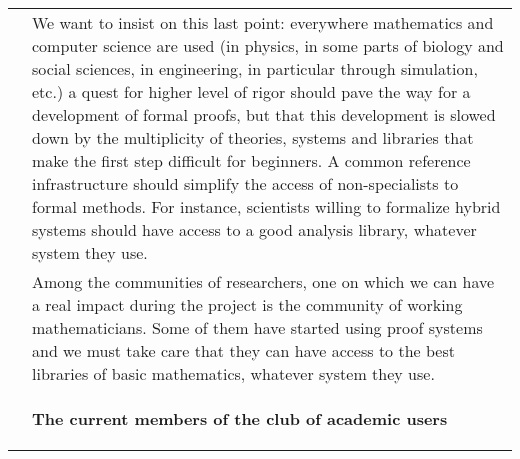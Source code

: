 \begin{longtable}{|p{}|p{}|}
&
\hspace{0.4cm}
We want to insist on this last point: everywhere mathematics and
computer science are used (in physics, in some parts of biology and
social sciences, in engineering, in particular through simulation,
etc.) a quest for higher level of rigor should pave the way for a
development of formal proofs, but that this development is slowed down
by the multiplicity of theories, systems and libraries that make the
first step difficult for beginners. A common reference infrastructure
should simplify the access of non-specialists to formal methods.  For
instance, scientists willing to formalize hybrid systems should have
access to a good analysis library, whatever system they use.\\
&
\hspace{0.4cm}
Among the communities of researchers, one on which we can have a real
impact during the project is the community of working mathematicians.
Some of them have started using proof systems and we must take care that they
can have access to the best libraries of basic mathematics, whatever system
they use.\\
&
\begin{framed}
\begin{center}
  {\bf \Large The current members of the club of academic users}
\end{center}


\end{framed}
\end{longtable}
